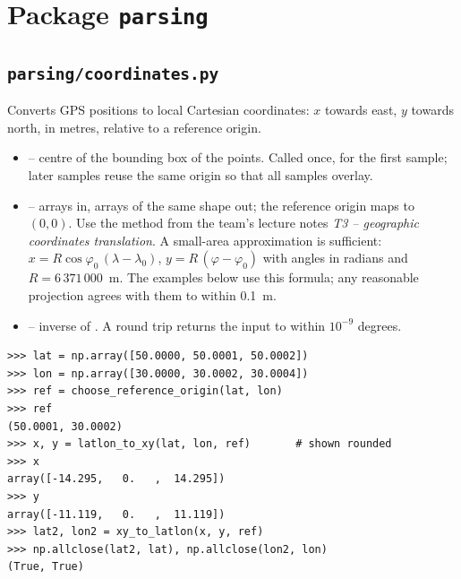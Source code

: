 \documentclass{article}
\begin{document}
\section{Package \texttt{parsing}}
\label{sec:parsing}

\subsection{\texttt{parsing/coordinates.py}}

Converts GPS positions to local Cartesian coordinates: $x$ towards east, $y$
towards north, in metres, relative to a reference origin.

\begin{itemize}
\item {} -- centre of
      the bounding box of the points. Called once, for the first sample; later
      samples reuse the same origin so that all samples overlay.
\item {} -- arrays in,
      arrays of the same shape out; the reference origin maps to $(0,0)$.
      Use the method from the team's lecture notes \emph{T3 -- geographic
      coordinates translation}. A small-area approximation is sufficient:
      $x=R\cos\varphi_0\,(\lambda-\lambda_0)$,
      $y=R\,(\varphi-\varphi_0)$ with angles in radians and
      $R=6\,371\,000$~m. The examples below use this formula; any reasonable
      projection agrees with them to within 0.1~m.
\item {} -- inverse of
      . A round trip returns the input to within
      $10^{-9}$ degrees.
\end{itemize}

\noindent\begin{minipage}{\textwidth}
\begin{lstlisting}
>>> lat = np.array([50.0000, 50.0001, 50.0002])
>>> lon = np.array([30.0000, 30.0002, 30.0004])
>>> ref = choose_reference_origin(lat, lon)
>>> ref
(50.0001, 30.0002)
>>> x, y = latlon_to_xy(lat, lon, ref)       # shown rounded
>>> x
array([-14.295,   0.   ,  14.295])
>>> y
array([-11.119,   0.   ,  11.119])
>>> lat2, lon2 = xy_to_latlon(x, y, ref)
>>> np.allclose(lat2, lat), np.allclose(lon2, lon)
(True, True)
\end{lstlisting}
\end{minipage}
\end{document}
